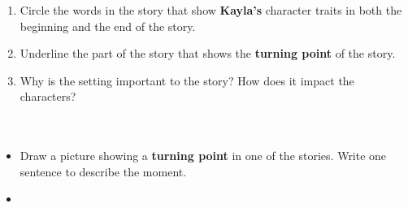 \documentclass[12pt]{article}
\begin{document}
\begin{tcolorbox}[colframe=black!60, colback=white, 
coltitle=black, colbacktitle=black!15, fonttitle=\bfseries\Large, 
title=Independent Practice, halign title=center, left=10pt, right=10pt, top=10pt, bottom=15pt]
\begin{enumerate}[itemsep=3em]
    \item Circle the words in the story that show \textbf{Kayla's} character traits in both the beginning and the end of the story.
    \item Underline the part of the story that shows the \textbf{turning point} of the story.
    \item Why is the setting important to the story? How does it impact the characters?
    \\[0.8cm] \underline{\hspace{14cm}}  
    \\[0.8cm] \underline{\hspace{14cm}}  
    \\[0.8cm] \underline{\hspace{14cm}} 
\end{enumerate}
\end{tcolorbox}

\vspace{1em}

\begin{tcolorbox}[colframe=black!60, colback=white, 
coltitle=black, colbacktitle=black!15, fonttitle=\bfseries\Large, 
title=Exit Ticket, halign title=center, left=10pt, right=10pt, top=10pt, bottom=15pt]
\begin{itemize}
    \item Draw a picture showing a \textbf{turning point} in one of the stories. Write one sentence to describe the moment.
    \item \vspace{8cm}
\end{itemize}
\end{tcolorbox}
\end{document}
